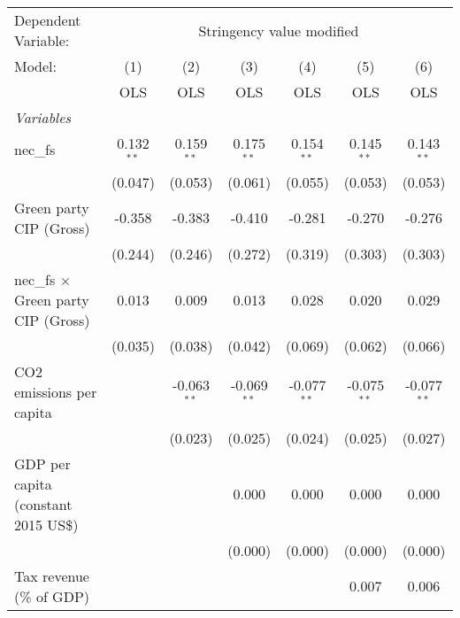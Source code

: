 
\begingroup
\centering
\begin{tabular}{lcccccc}
   \toprule
   Dependent Variable: & \multicolumn{6}{c}{Stringency value modified}\\
   Model:                                     & (1)          & (2)           & (3)           & (4)           & (5)           & (6)\\  
                                              &  OLS         & OLS           & OLS           & OLS           & OLS           & OLS\\  
   \midrule
   \emph{Variables}\\
   nec\_fs                                    & 0.132$^{**}$ & 0.159$^{**}$  & 0.175$^{**}$  & 0.154$^{**}$  & 0.145$^{**}$  & 0.143$^{**}$\\   
                                              & (0.047)      & (0.053)       & (0.061)       & (0.055)       & (0.053)       & (0.053)\\   
   Green party CIP (Gross)                    & -0.358       & -0.383        & -0.410        & -0.281        & -0.270        & -0.276\\   
                                              & (0.244)      & (0.246)       & (0.272)       & (0.319)       & (0.303)       & (0.303)\\   
   nec\_fs $\times$ Green party CIP (Gross)   & 0.013        & 0.009         & 0.013         & 0.028         & 0.020         & 0.029\\   
                                              & (0.035)      & (0.038)       & (0.042)       & (0.069)       & (0.062)       & (0.066)\\   
   CO2 emissions per capita                   &              & -0.063$^{**}$ & -0.069$^{**}$ & -0.077$^{**}$ & -0.075$^{**}$ & -0.077$^{**}$\\   
                                              &              & (0.023)       & (0.025)       & (0.024)       & (0.025)       & (0.027)\\   
   GDP per capita (constant 2015 US\$)        &              &               & 0.000         & 0.000         & 0.000         & 0.000\\   
                                              &              &               & (0.000)       & (0.000)       & (0.000)       & (0.000)\\   
   Tax revenue (\% of GDP)                    &              &               &               &               & 0.007         & 0.006\\   

\end{tabular}
